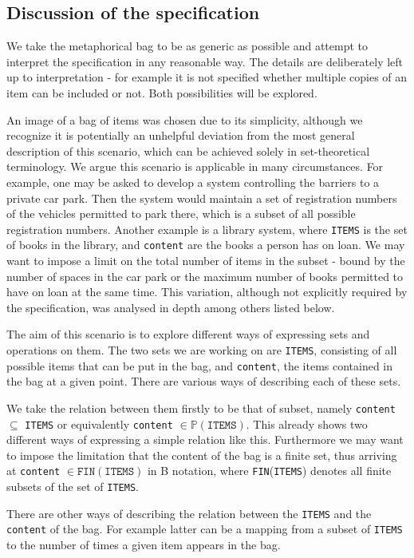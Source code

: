 \documentclass[12pt,journal,duplex]{IEEEtran}
\begin{document}
	\subsection{Discussion of the specification}
	We take the metaphorical bag to be as generic as possible and attempt to interpret the specification in any reasonable way. The details are deliberately left up to interpretation - for example it is not specified whether multiple copies of an item can be included or not. Both possibilities will be explored.

	An image of a bag of items was chosen due to its simplicity, although we recognize it is potentially an unhelpful deviation from the most general description of this scenario, which can be achieved solely in set-theoretical terminology. We argue this scenario is applicable in many circumstances. For example, one may be asked to develop a system controlling the barriers to a private car park. Then the system would maintain a set of registration numbers of the vehicles permitted to park there, which is a subset of all possible registration numbers. Another example is a library system, where \texttt{ITEMS} is the set of books in the library, and \texttt{content} are the books a person has on loan. We may want to impose a limit on the total number of items in the subset - bound by the number of spaces in the car park or the maximum number of books permitted to have on loan at the same time. This variation, although not explicitly required by the specification, was analysed in depth among others listed below.

	The aim of this scenario is to explore different ways of expressing sets and operations on them. The two sets we are working on are \texttt{ITEMS}, consisting of all possible items that can be put in the bag, and \texttt{content}, the items contained in the bag at a given point. There are various ways of describing each of these sets.

	We take the relation between them firstly to be that of subset, namely \texttt{content} $\subseteq$ \texttt{ITEMS} or equivalently \texttt{content} $\in \mathbb{P}(\texttt{ITEMS})$. This already shows two different ways of expressing a simple relation like this. Furthermore we may want to impose the limitation that the content of the bag is a finite set, thus arriving at \texttt{content} $\in \texttt{FIN}(\texttt{ITEMS})$ in B notation, where \texttt{FIN}(\texttt{ITEMS}) denotes all finite subsets of the set of \texttt{ITEMS}.

	There are other ways of describing the relation between the \texttt{ITEMS} and the \texttt{content} of the bag. For example latter can be a mapping from a subset of \texttt{ITEMS} to the number of times a given item appears in the bag.
\end{document}
